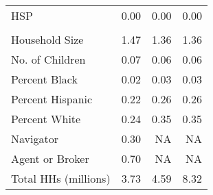 \begin{tabular}{lrrr}
\hspace{1em}HSP & 0.00 & 0.00 & 0.00\\
\addlinespace[0.3em]
\multicolumn{4}{l}{\textbf{Household Characteristics}}\\
\hspace{1em}Household Size & 1.47 & 1.36 & 1.36\\
\hspace{1em}No. of Children & 0.07 & 0.06 & 0.06\\
\hspace{1em}Percent Black & 0.02 & 0.03 & 0.03\\
\hspace{1em}Percent Hispanic & 0.22 & 0.26 & 0.26\\
\hspace{1em}Percent White & 0.24 & 0.35 & 0.35\\
\hspace{1em}Navigator & 0.30 & NA & NA\\
\hspace{1em}Agent or Broker & 0.70 & NA & NA\\
\hspace{1em}Total HHs (millions) & 3.73 & 4.59 & 8.32\\
\bottomrule
\end{tabular}
